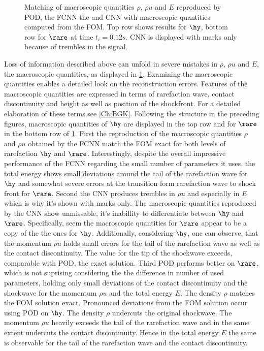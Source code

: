 \begin{figure}[H]
	
	\caption{Matching of macroscopic quantities \(\rho\), \(\rho u\) and \(E\) reproduced by POD, the FCNN the and CNN with macroscopic quantities computed from the FOM. Top row shows results for \(\hy\), bottom row for \(\rare\) at time \(t_i=0.12s\). CNN is displayed with marks only because of trembles in the signal.}
	\label{Fig:ErrMacro}
\end{figure}
Loss of information described above can unfold in severe mistakes in \(\rho\), \(\rho u\) and \(E\), the macroscopic quantities, as displayed in \cref{Fig:ErrMacro}. Examining the macroscopic quantities enables a detailed look on the reconstruction errors. Features of the macroscopic quantities are expressed in terms of rarefaction wave, contact discontinuity and height as well as position of the shockfront. For a detailed elaboration of these terms see \cref{Ch:BGK}. Following the structure in the preceding figures, macroscopic quantities of \(\hy\) are displayed in the top row and for \(\rare\) in the bottom row of \cref{Fig:ErrMacro}. First the reproduction of the macroscopic quantities \(\rho\) and \(\rho u\)  obtained by the FCNN match the FOM exact for both levels of rarefaction \(\hy\) and \(\rare\). Interestingly, despite the overall impressive performance of the FCNN regarding the small number of parameters it uses, the total energy shows small deviations around the tail of the rarefaction wave for \(\hy\) and somewhat severe errors at the transition form rarefaction wave to shock front for \(\rare\). Second the CNN produces trembles in \(\rho u\) and especially in \(E\) which is why it's shown with marks only. The macroscopic quantities reproduced by the CNN show unmissable, it's inabillity to differentiate between \(\hy\) and \(\rare\). Specifically, seem the macroscopic quantities for \(\rare\) appear to be a copy of the the ones for \(\hy\). Additionally, considering \(\hy\), one can observe, that the momentum \(\rho u\) holds small errors for the tail of the rarefaction wave as well as the contact discontinuity. The value for the tip of the shockwave exceeds, comparable with POD, the exact solution. Third POD performs better on \(\rare\), which is not suprising considering the the difference in number of used parameters, holding only small deviations of the contact discontinuity and the shockwave for the momentum \(\rho u\) and the total energy \(E\). The density \(\rho\) matches the FOM solution exact. Pronounced deviations from the FOM solution occur using POD on \(\hy\). The density \(\rho\) undercuts the original shockwave. The momentum \(\rho u\) heavily exceeds the tail of the rarefaction wave and in the same extent undercuts the contact discontinuity. Hence in the total energy \(E\) the same is observable for the tail of the rarefaction wave and the contact discontinuity.
